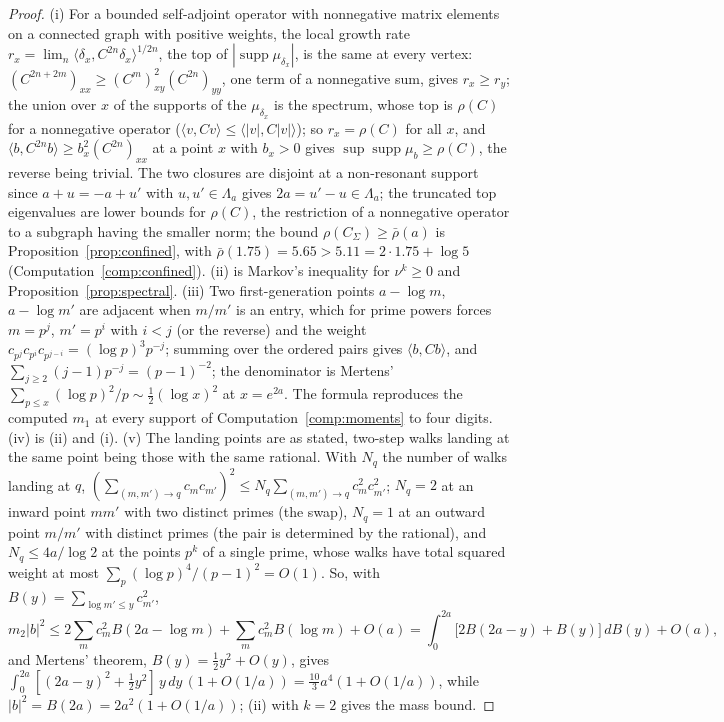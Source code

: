 \documentclass[11pt]{article}
\theoremstyle{definition}
\theoremstyle{remark}
\begin{document}
\begin{proof}
(i) For a bounded self-adjoint operator with nonnegative matrix elements on a connected graph with positive weights, the local growth rate $r_x=\lim_n\langle\delta_x,C^{2n}\delta_x\rangle^{1/2n}$, the top of $|\operatorname{supp}\mu_{\delta_x}|$, is the same at every vertex: $(C^{2n+2m})_{xx}\ge(C^m)_{xy}^2(C^{2n})_{yy}$, one term of a nonnegative sum, gives $r_x\ge r_y$; the union over $x$ of the supports of the $\mu_{\delta_x}$ is the spectrum, whose top is $\rho(C)$ for a nonnegative operator ($\langle v,Cv\rangle\le\langle|v|,C|v|\rangle$); so $r_x=\rho(C)$ for all $x$, and $\langle b,C^{2n}b\rangle\ge b_x^2(C^{2n})_{xx}$ at a point $x$ with $b_x>0$ gives $\sup\operatorname{supp}\mu_b\ge\rho(C)$, the reverse being trivial. The two closures are disjoint at a non-resonant support since $a+u=-a+u'$ with $u,u'\in\Lambda_a$ gives $2a=u'-u\in\Lambda_a$; the truncated top eigenvalues are lower bounds for $\rho(C)$, the restriction of a nonnegative operator to a subgraph having the smaller norm; the bound $\rho(C_\Sigma)\ge\bar\rho(a)$ is Proposition~\ref{prop:confined}, with $\bar\rho(1.75)=5.65>5.11=2\cdot1.75+\log5$ (Computation~\ref{comp:confined}). (ii) is Markov's inequality for $\nu^k\ge0$ and Proposition~\ref{prop:spectral}. (iii) Two first-generation points $a-\log m$, $a-\log m'$ are adjacent when $m/m'$ is an entry, which for prime powers forces $m=p^j$, $m'=p^i$ with $i<j$ (or the reverse) and the weight $c_{p^j}c_{p^i}c_{p^{j-i}}=(\log p)^3p^{-j}$; summing over the ordered pairs gives $\langle b,Cb\rangle$, and $\sum_{j\ge2}(j-1)p^{-j}=(p-1)^{-2}$; the denominator is Mertens' $\sum_{p\le x}(\log p)^2/p\sim\tfrac12(\log x)^2$ at $x=e^{2a}$. The formula reproduces the computed $m_1$ at every support of Computation~\ref{comp:moments} to four digits. (iv) is (ii) and (i). (v) The landing points are as stated, two-step walks landing at the same point being those with the same rational. With $N_q$ the number of walks landing at $q$, $(\sum_{(m,m')\to q}c_mc_{m'})^2\le N_q\sum_{(m,m')\to q}c_m^2c_{m'}^2$; $N_q=2$ at an inward point $mm'$ with two distinct primes (the swap), $N_q=1$ at an outward point $m/m'$ with distinct primes (the pair is determined by the rational), and $N_q\le4a/\log2$ at the points $p^k$ of a single prime, whose walks have total squared weight at most $\sum_p(\log p)^4/(p-1)^2=O(1)$. So, with $B(y)=\sum_{\log m'\le y}c_{m'}^2$,
\[
m_2|b|^2\le2\sum_mc_m^2B(2a-\log m)+\sum_mc_m^2B(\log m)+O(a)=\int_0^{2a}\big[2B(2a-y)+B(y)\big]\,dB(y)+O(a),
\]
and Mertens' theorem, $B(y)=\tfrac12y^2+O(y)$, gives $\int_0^{2a}[(2a-y)^2+\tfrac12y^2]\,y\,dy\,(1+O(1/a))=\tfrac{10}3a^4(1+O(1/a))$, while $|b|^2=B(2a)=2a^2(1+O(1/a))$; (ii) with $k=2$ gives the mass bound.
\end{proof}
\end{document}
